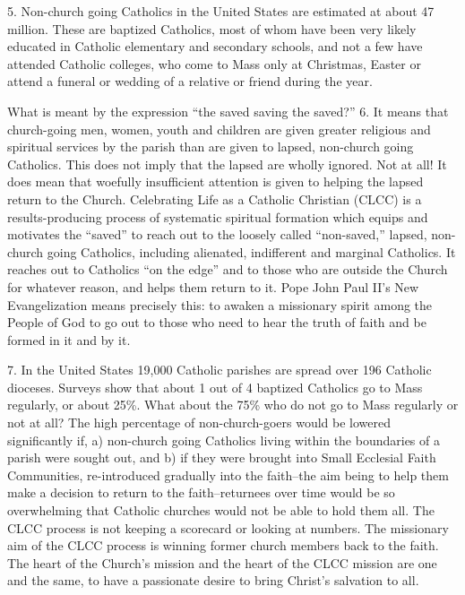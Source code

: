 \documentclass[oneside]{book}
\begin{document}
5. Non-church going Catholics in the United States are estimated at about 47
million. These are baptized Catholics, most of whom have been very likely
educated in Catholic elementary and secondary schools, and not a few have
attended Catholic colleges, who come to Mass only at Christmas, Easter or attend
a funeral or wedding of a relative or friend during the year.

What is meant by the expression ``the saved saving the saved?''
6. It means that church-going men, women, youth and children are given greater
religious and spiritual services by the parish than are given to lapsed,
non-church going Catholics. This does not imply that the lapsed are wholly
ignored. Not at all! It does mean that woefully insufficient attention is given
to helping the lapsed return to the Church. Celebrating Life as a Catholic
Christian (CLCC) is a results-producing process of systematic spiritual
formation which equips and motivates the ``saved'' to reach out to the loosely
called ``non-saved,'' lapsed, non-church going Catholics, including alienated,
indifferent and marginal Catholics. It reaches out to Catholics ``on the edge''
and to those who are outside the Church for whatever reason, and helps them
return to it.
Pope John Paul II's New Evangelization means precisely this: to awaken a
missionary spirit among the People of God to go out to those who need to hear
the truth of faith and be formed in it and by it.

7. In the United States 19,000 Catholic parishes are spread over 196 Catholic
dioceses. Surveys show that about 1 out of 4 baptized Catholics go to Mass
regularly, or about 25\%. What about the 75\% who do not go to Mass regularly or
not at all? The high percentage of non-church-goers would be lowered
significantly if, a) non-church going Catholics living within the boundaries of
a parish were sought out, and b) if they were brought into Small Ecclesial Faith
Communities, re-introduced gradually into the faith--the aim being to help them
make a decision to return to the faith--returnees over time would be so
overwhelming that Catholic churches would not be able to hold them all.
The CLCC process is not keeping a scorecard or looking at numbers. The
missionary aim of the CLCC process is winning former church members back to the
faith. The heart of the Church's mission and the heart of the CLCC mission are
one and the same, to have a passionate desire to bring Christ's salvation to
all.
\end{document}

